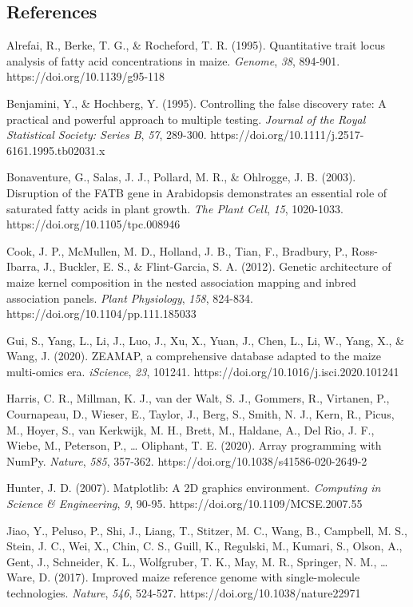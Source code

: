 \documentclass[
]{article}
\begin{document}
\subsection{References}\label{references}

Alrefai, R., Berke, T. G., \& Rocheford, T. R. (1995). Quantitative
trait locus analysis of fatty acid concentrations in maize.
\emph{Genome}, \emph{38}, 894-901. https://doi.org/10.1139/g95-118

Benjamini, Y., \& Hochberg, Y. (1995). Controlling the false discovery
rate: A practical and powerful approach to multiple testing.
\emph{Journal of the Royal Statistical Society: Series B}, \emph{57},
289-300. https://doi.org/10.1111/j.2517-6161.1995.tb02031.x

Bonaventure, G., Salas, J. J., Pollard, M. R., \& Ohlrogge, J. B.
(2003). Disruption of the FATB gene in Arabidopsis demonstrates an
essential role of saturated fatty acids in plant growth. \emph{The Plant
Cell}, \emph{15}, 1020-1033. https://doi.org/10.1105/tpc.008946

Cook, J. P., McMullen, M. D., Holland, J. B., Tian, F., Bradbury, P.,
Ross-Ibarra, J., Buckler, E. S., \& Flint-Garcia, S. A. (2012). Genetic
architecture of maize kernel composition in the nested association
mapping and inbred association panels. \emph{Plant Physiology},
\emph{158}, 824-834. https://doi.org/10.1104/pp.111.185033

Gui, S., Yang, L., Li, J., Luo, J., Xu, X., Yuan, J., Chen, L., Li, W.,
Yang, X., \& Wang, J. (2020). ZEAMAP, a comprehensive database adapted
to the maize multi-omics era. \emph{iScience}, \emph{23}, 101241.
https://doi.org/10.1016/j.isci.2020.101241

Harris, C. R., Millman, K. J., van der Walt, S. J., Gommers, R.,
Virtanen, P., Cournapeau, D., Wieser, E., Taylor, J., Berg, S., Smith,
N. J., Kern, R., Picus, M., Hoyer, S., van Kerkwijk, M. H., Brett, M.,
Haldane, A., Del Rio, J. F., Wiebe, M., Peterson, P., \ldots{} Oliphant,
T. E. (2020). Array programming with NumPy. \emph{Nature}, \emph{585},
357-362. https://doi.org/10.1038/s41586-020-2649-2

Hunter, J. D. (2007). Matplotlib: A 2D graphics environment.
\emph{Computing in Science \& Engineering}, \emph{9}, 90-95.
https://doi.org/10.1109/MCSE.2007.55

Jiao, Y., Peluso, P., Shi, J., Liang, T., Stitzer, M. C., Wang, B.,
Campbell, M. S., Stein, J. C., Wei, X., Chin, C. S., Guill, K.,
Regulski, M., Kumari, S., Olson, A., Gent, J., Schneider, K. L.,
Wolfgruber, T. K., May, M. R., Springer, N. M., \ldots{} Ware, D.
(2017). Improved maize reference genome with single-molecule
technologies. \emph{Nature}, \emph{546}, 524-527.
https://doi.org/10.1038/nature22971
\end{document}
